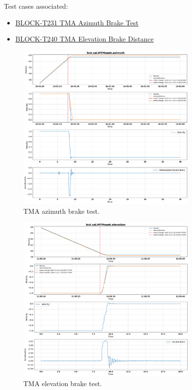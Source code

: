 Test cases associated:
\begin{itemize}
    \item \href{https://rubinobs.atlassian.net/projects/BLOCK?selectedItem=com.atlassian.plugins.atlassian-connect-plugin:com.kanoah.test-manager__main-project-page#!/v2/testCase/BLOCK-T231}{BLOCK-T231 TMA Azimuth Brake Test}
    \item \href{https://rubinobs.atlassian.net/projects/BLOCK?selectedItem=com.atlassian.plugins.atlassian-connect-plugin:com.kanoah.test-manager__main-project-page#!/v2/testCase/BLOCK-T240}{BLOCK-T240 TMA Elevation Brake Distance}
\end{itemize}

\begin{figure}
    \centering
    \includegraphics[width=0.8\textwidth]{spa/TMA_Az_brake_test_10.png}
    \caption{TMA azimuth brake test.}
    \label{fig:tma_azimuth_brake}
    \end{figure}

\begin{figure}
    \centering
    \includegraphics[width=0.8\textwidth]{spa/TMA_El_brake_test_10.png}
    \caption{TMA elevation brake test.}
    \label{fig:tma_elevation_brake}
    \end{figure}


